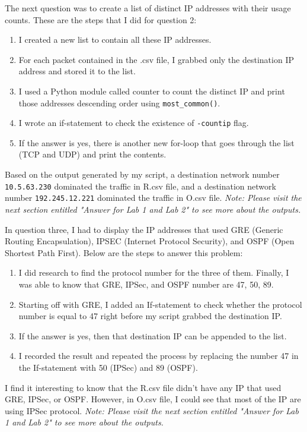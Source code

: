 \documentclass[letterpaper,10pt,titlepage,draftclsnofoot,onecolumn]{IEEEtran}
\begin{document}
The next question was to create a list of distinct IP addresses with their usage counts.
These are the steps that I did for question 2:
\begin{enumerate}
\item I created a new list to contain all these IP addresses. 
\item For each packet contained in the .csv file, I grabbed only the destination IP address and stored it to the list.
\item I used a Python module called counter to count the distinct IP and print those addresses descending order using \verb|most_common()|. 
\item I wrote an if-statement to check the existence of \verb|-countip| flag. 
\item If the answer is yes, there is another new for-loop that goes through the list (TCP and UDP) and print the contents. 
\end{enumerate}
Based on the output generated by my script, a destination network number \verb|10.5.63.230| dominated the traffic in R.csv file, and a destination network number \verb|192.245.12.221| dominated the traffic in O.csv file.
\textit{Note: Please visit the next section entitled "Answer for Lab 1 and Lab 2" to see more about the outputs.}

In question three, I had to display the IP addresses that used GRE (Generic Routing Encapsulation), IPSEC (Internet Protocol Security), and OSPF (Open Shortest Path First).
Below are the steps to answer this problem:
\begin{enumerate}
\item I did research to find the protocol number for the three of them. Finally, I was able to know that GRE, IPSec, and OSPF number are 47, 50, 89.
\item Starting off with GRE, I added an If-statement to check whether the protocol number is equal to 47 right before my script grabbed the destination IP. 
\item If the answer is yes, then that destination IP can be appended to the list.
\item I recorded the result and repeated the process by replacing the number 47 in the If-statement with 50 (IPSec) and 89 (OSPF).
\end{enumerate}
I find it interesting to know that the R.csv file didn't have any IP that used GRE, IPSec, or OSPF.
However, in O.csv file, I could see that most of the IP are using IPSec protocol.
\textit{Note: Please visit the next section entitled "Answer for Lab 1 and Lab 2" to see more about the outputs.}
\end{document}
